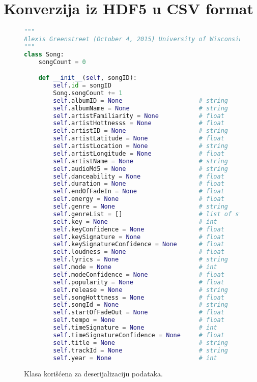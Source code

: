 \section{Konverzija iz HDF5 u CSV format}
\label{sec:DodatakIzvlacenje}

\begin{figure}[h]
\lstset{style=mystyle}
\begin{lstlisting}[language=Python, basicstyle=\footnotesize]
"""
Alexis Greenstreet (October 4, 2015) University of Wisconsin-Madison
"""
class Song:
    songCount = 0

    def __init__(self, songID):
        self.id = songID
        Song.songCount += 1
        self.albumID = None                     # string
        self.albumName = None                   # string
        self.artistFamiliarity = None           # float
        self.artistHottnesss = None             # float
        self.artistID = None                    # string
        self.artistLatitude = None              # float
        self.artistLocation = None              # string
        self.artistLongitude = None             # float
        self.artistName = None                  # string
        self.audioMd5 = None                    # string
        self.danceability = None                # float
        self.duration = None                    # float
        self.endOfFadeIn = None                 # float
        self.energy = None                      # float
        self.genre = None                       # string
        self.genreList = []                     # list of strings
        self.key = None                         # int
        self.keyConfidence = None               # float
        self.keySignature = None                # float
        self.keySignatureConfidence = None      # float
        self.loudness = None                    # float
        self.lyrics = None                      # string
        self.mode = None                        # int
        self.modeConfidence = None              # float
        self.popularity = None                  # float
        self.release = None                     # string
        self.songHotttness = None               # float
        self.songId = None                      # string
        self.startOfFadeOut = None              # float
        self.tempo = None                       # float
        self.timeSignature = None               # int
        self.timeSignatureConfidence = None     # float
        self.title = None                       # string
        self.trackId = None                     # string
        self.year = None                        # int
\end{lstlisting}
\label{code:SongClass}
\caption{Klasa kori\v{s}\'c{}ena za deserijalizaciju podataka.}
\end{figure}

